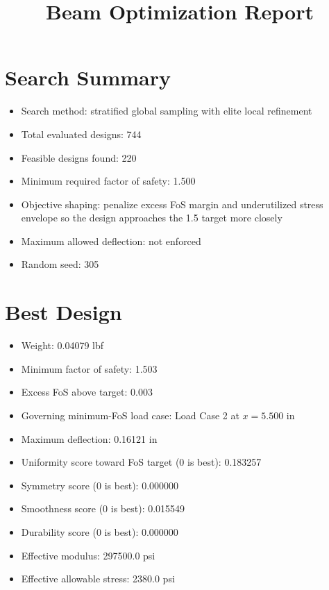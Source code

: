 \documentclass[11pt]{article}
\title{Beam Optimization Report}
\date{}
\begin{document}
\maketitle

\section*{Search Summary}
\begin{itemize}
\item Search method: stratified global sampling with elite local refinement
\item Total evaluated designs: 744
\item Feasible designs found: 220
\item Minimum required factor of safety: 1.500
\item Objective shaping: penalize excess FoS margin and underutilized stress envelope so the design approaches the 1.5 target more closely
\item Maximum allowed deflection: not enforced
\item Random seed: 305
\end{itemize}

\section*{Best Design}
\begin{itemize}
\item Weight: 0.04079 lbf
\item Minimum factor of safety: 1.503
\item Excess FoS above target: 0.003
\item Governing minimum-FoS load case: Load Case 2 at $x=5.500$ in
\item Maximum deflection: 0.16121 in
\item Uniformity score toward FoS target (0 is best): 0.183257
\item Symmetry score (0 is best): 0.000000
\item Smoothness score (0 is best): 0.015549
\item Durability score (0 is best): 0.000000
\item Effective modulus: 297500.0 psi
\item Effective allowable stress: 2380.0 psi
\end{itemize}
\end{document}
